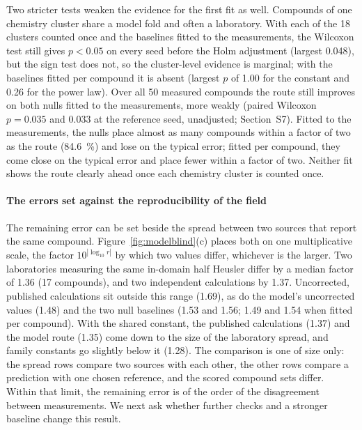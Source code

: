 Two stricter tests weaken the evidence for the first fit as well. Compounds of one chemistry cluster
share a model fold and often a laboratory. With each of the \num{18} clusters counted once and the
baselines fitted to the measurements, the Wilcoxon test still gives $p<0.05$ on every seed before
the Holm adjustment (largest \num{0.048}), but the sign test does not, so the cluster-level evidence
is marginal; with the baselines fitted per compound it is absent (largest $p$ of \num{1.00} for the
constant and \num{0.26} for the power law). Over all \num{50} measured compounds the route still
improves on both nulls fitted to the measurements, more weakly (paired Wilcoxon $p=\num{0.035}$ and \num{0.033} at the reference seed, unadjusted; Section~S7). Fitted to the measurements, the nulls place almost as many compounds within a factor of two as the
route (\SI{84.6}{\percent}) and lose on the typical error; fitted per compound, they come close on the
typical error and place fewer within a factor of two. Neither fit shows the route clearly ahead once
each chemistry cluster is counted once.

\paragraph{The errors set against the reproducibility of the field}
The remaining error can be set beside the spread between two sources that report the same compound.
Figure~\ref{fig:modelblind}(c) places both on one multiplicative scale, the factor
$10^{|\log_{10} r|}$ by which two values differ, whichever is the larger. Two laboratories
measuring the same in-domain half Heusler differ by a median factor of \num{1.36} (\num{17} compounds), and two
independent calculations by \num{1.37}. Uncorrected, published calculations sit outside this range
(\num{1.69}), as do the model's uncorrected values (\num{1.48}) and the two null baselines (\num{1.53} and \num{1.56}; \num{1.49} and \num{1.54} when fitted per compound). With the shared constant, the published calculations (\num{1.37}) and
the model route (\num{1.35}) come down to the size of the laboratory spread, and family constants go
slightly below it (\num{1.28}). The comparison is one of size only: the spread rows compare two
sources with each other, the other rows compare a prediction with one chosen reference, and the
scored compound sets differ. Within that limit, the remaining error is of the order of the
disagreement between measurements. We next ask whether further checks and a stronger baseline change this result.


